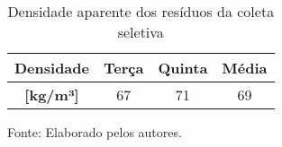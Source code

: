 \begin{center}
	\begin{table}[htbp]
		\label{tab:densidade_aparente_seletiva}
		\centering
		\caption{Densidade aparente dos resíduos da coleta seletiva}
		\begin{tabular}{c|c|c|c}
			\rowcolor[rgb]{ .969,  .588,  .275} \textbf{Densidade} & \textbf{Terça} & \textbf{Quinta} & \textbf{Média} \\
			\midrule
			\rowcolor[rgb]{ .969,  .588,  .275} \textbf{[kg/m³]} & \cellcolor[rgb]{ .976,  .737,  .541}67 & \cellcolor[rgb]{ .976,  .737,  .541}71 & \cellcolor[rgb]{ .976,  .737,  .541}69 \\
		\end{tabular}%
	\end{table}
	Fonte: Elaborado pelos autores.
\end{center}